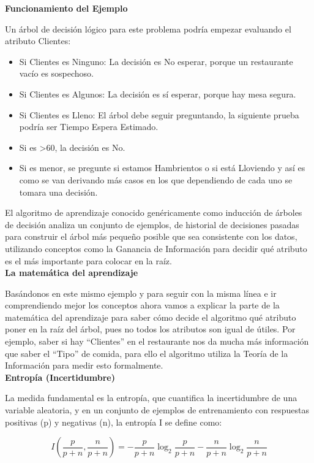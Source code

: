 \documentclass[letterpaper,12pt]{article}
\begin{document}
\begin{itemize}
    
    \textbf{Funcionamiento del Ejemplo}
    
    Un árbol de decisión lógico para este problema podría empezar evaluando el atributo Clientes:
    \begin{itemize}
        \item Si Clientes es Ninguno: La decisión es No esperar, porque un restaurante vacío es sospechoso.
        \item Si Clientes es Algunos: La decisión es sí esperar, porque hay mesa segura.
        \item Si Clientes es Lleno: El árbol debe seguir preguntando, la siguiente prueba podría ser Tiempo Espera Estimado.
        \item Si es >60, la decisión es No.
        \item Si es menor, se pregunte si estamos Hambrientos o si está Lloviendo y así es como se van derivando más casos en los que dependiendo de cada uno se tomara una decisión.
    \end{itemize}
    
    El algoritmo de aprendizaje conocido genéricamente como inducción de árboles de decisión analiza un conjunto de ejemplos, de historial de decisiones pasadas para construir el árbol más pequeño posible que sea consistente con los datos, utilizando conceptos como la Ganancia de Información para decidir qué atributo es el más importante para colocar en la raíz.\\

    \textbf{La matemática del aprendizaje}
    
    Basándonos en este mismo ejemplo y para seguir con la misma línea e ir comprendiendo mejor los conceptos ahora vamos a explicar la parte de la matemática del aprendizaje para saber cómo decide el algoritmo qué atributo poner en la raíz del árbol, pues no todos los atributos son igual de útiles. Por ejemplo, saber si hay ``Clientes'' en el restaurante nos da mucha más información que saber el ``Tipo'' de comida, para ello el algoritmo utiliza la Teoría de la Información para medir esto formalmente.\\
    
    \textbf{Entropía (Incertidumbre)}
    
    La medida fundamental es la entropía, que cuantifica la incertidumbre de una variable aleatoria, y en un conjunto de ejemplos de entrenamiento con respuestas positivas (p) y negativas (n), la entropía I se define como:
    
    $$I\left(\frac{p}{p+n},\frac{n}{p+n}\right)=-\frac{p}{p+n}\log_{2}\frac{p}{p+n}-\frac{n}{p+n}\log_{2}\frac{n}{p+n}$$
    

\end{itemize}
\end{document}
